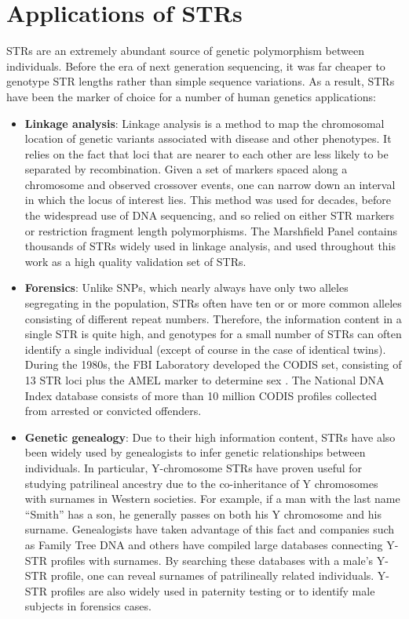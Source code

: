 \section{Applications of STRs}
STRs are an extremely abundant source of genetic polymorphism between individuals. Before the era of next generation sequencing, it was far cheaper to genotype STR lengths rather than simple sequence variations. As a result, STRs have been the marker of choice for a number of human genetics applications:
\begin{itemize}
\item \textbf{Linkage analysis}: Linkage analysis is a method to map the chromosomal location of genetic variants associated with disease and other phenotypes. It relies on the fact that loci that are nearer to each other are less likely to be separated by recombination. Given a set of markers spaced along a chromosome and observed crossover events, one can narrow down an interval in which the locus of interest lies. This method was used for decades, before the widespread use of DNA sequencing, and so relied on either STR markers or restriction fragment length polymorphisms. The Marshfield Panel \cite{BromanMurraySheffieldEtAl1998} contains thousands of STRs widely used in linkage analysis, and used throughout this work as a high quality validation set of STRs. 
\item \textbf{Forensics}: Unlike SNPs, which nearly always have only two alleles segregating in the population, STRs often have ten or or more common alleles consisting of different repeat numbers. Therefore, the information content in a single STR is quite high, and genotypes for a small number of STRs can often identify a single individual (except of course in the case of identical twins). During the 1980s, the FBI Laboratory developed the CODIS set, consisting of 13 STR loci plus the AMEL marker to determine sex \cite{BudowleSheaNiezgodaEtAl2001}. The National DNA Index database consists of more than 10 million CODIS profiles collected from arrested or convicted offenders. 
\item \textbf{Genetic genealogy}: Due to their high information content, STRs have also been widely used by genealogists to infer genetic relationships between individuals. In particular, Y-chromosome STRs have proven useful for studying patrilineal ancestry due to the co-inheritance of Y chromosomes with surnames in Western societies. For example, if a man with the last name ``Smith'' has a son, he generally passes on both his Y chromosome and his surname. Genealogists have taken advantage of this fact and companies such as Family Tree DNA and others have compiled large databases connecting Y-STR profiles with surnames. By searching these databases with a male's Y-STR profile, one can reveal surnames of patrilineally related individuals. Y-STR profiles are also widely used in paternity testing or to identify male subjects in forensics cases.
\end{itemize}

